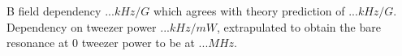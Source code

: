 \documentclass[aps,prl,twocolumn,groupedaddress]{revtex4-1}
\newcommand{\todo}[1]{}
\begin{document}
B field dependency $... kHz/G$ which agrees with theory prediction of $... kHz/G$.
Dependency on tweezer power $... kHz/mW$, extrapulated to obtain the bare resonance at $0$ tweezer power to be at $... MHz$.

\todo{sm: STIRAP vs Raman}



\end{document}
